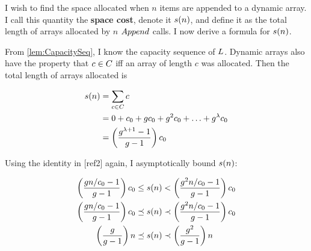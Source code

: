 \HdrSpaceComplex

I wish to find the space allocated when $n$ items are appended to a dynamic array. I call this quantity the \textbf{space cost}, denote it $s(n)$, and define it as the total length of arrays allocated by $n$ $Append$ calls. I now derive a formula for $s(n)$.

From \ref{lem:CapacitySeq}, I know the capacity sequence of $L$. Dynamic arrays also have the property that $c \in C$ iff an array of length $c$ was allocated. Then the total length of arrays allocated is

\begin{align*}
s(n) &= \sum_{c \in C} c\\
&= 0 + c_0 + gc_0 + g^2c_0 + \ldots + g^\lambda c_0\\
&= \left( \frac{g^{\lambda + 1} - 1}{g - 1} \right) c_0
\end{align*}

Using the identity in [ref2] again, I asymptotically bound $s(n)$:

\begin{align*}
\left( \frac{g{n} / c_0 - 1}{g - 1} \right) c_0 \leq s(n) &< \left( \frac{g^2{n} / c_0 - 1}{g - 1} \right) c_0\\
\left( \frac{g{n} / c_0 - 1}{g - 1} \right) c_0 \preceq s(n) &\prec \left( \frac{g^2{n} / c_0 - 1}{g - 1} \right) c_0\\
\left( \frac{g}{g - 1} \right) n \preceq s(n) &\prec \left( \frac{g^2}{g - 1} \right) n
\end{align*}